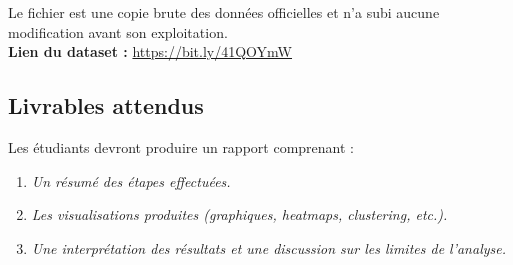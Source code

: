 \documentclass[a4paper,14pt]{article}
\begin{document}
Le fichier est une copie brute des données officielles et n'a subi aucune modification avant son exploitation.\\

\textbf{Lien du dataset :} \href{https://bit.ly/41QOYmW}{https://bit.ly/41QOYmW}

    \vspace{1cm}
    \subsection*{Livrables attendus}
    Les étudiants devront produire un rapport comprenant :
    \begin{enumerate}[leftmargin=*, label=\arabic*)]
        \item \textit{Un résumé des étapes effectuées.}
        \item \textit{Les visualisations produites (graphiques, heatmaps, clustering, etc.).}
        \item \textit{Une interprétation des résultats et une discussion sur les limites de l'analyse.}
    \end{enumerate}

 \newpage
 

 
\end{document}
